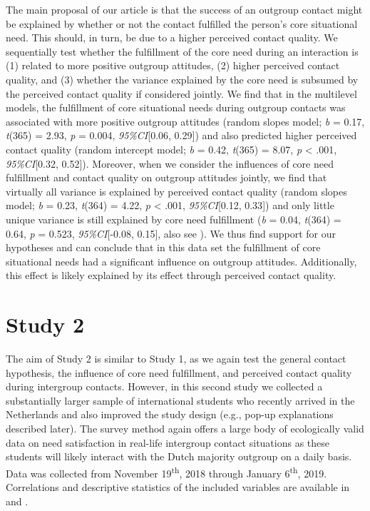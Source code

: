The main proposal of our article is that the success of an outgroup
contact might be explained by whether or not the contact fulfilled the
person's core situational need. This should, in turn, be due to a higher
perceived contact quality. We sequentially test whether the fulfillment
of the core need during an interaction is (1) related to more positive
outgroup attitudes, (2) higher perceived contact quality, and (3)
whether the variance explained by the core need is subsumed by the
perceived contact quality if considered jointly. We find that in the
multilevel models, the fulfillment of core situational needs during
outgroup contacts was associated with more positive outgroup attitudes
(random slopes model; \textit{b} = 0.17, \textit{t}(365) = 2.93,
\textit{p} = 0.004, \textit{95\%CI}{[}0.06, 0.29{]}) and also predicted
higher perceived contact quality (random intercept model; \textit{b} =
0.42, \textit{t}(365) = 8.07, \textit{p} \textless{} .001,
\textit{95\%CI}{[}0.32, 0.52{]}). Moreover, when we consider the
influences of core need fulfillment and contact quality on outgroup
attitudes jointly, we find that virtually all variance is explained by
perceived contact quality (random slopes model; \textit{b} = 0.23,
\textit{t}(364) = 4.22, \textit{p} \textless{} .001,
\textit{95\%CI}{[}0.12, 0.33{]}) and only little unique variance is
still explained by core need fulfillment (\textit{b} = 0.04,
\textit{t}(364) = 0.64, \textit{p} = 0.523, \textit{95\%CI}{[}-0.08,
0.15{]}, also see ). We thus find support for
our hypotheses and can conclude that in this data set the fulfillment of
core situational needs had a significant influence on outgroup
attitudes. Additionally, this effect is likely explained by its effect
through perceived contact quality.

\section{Study 2}

The aim of Study 2 is similar to Study 1, as we again test the general
contact hypothesis, the influence of core need fulfillment, and
perceived contact quality during intergroup contacts. However, in this
second study we collected a substantially larger sample of international
students who recently arrived in the Netherlands and also improved the
study design (e.g., pop-up explanations described later). The survey
method again offers a large body of ecologically valid data on need
satisfaction in real-life intergroup contact situations as these
students will likely interact with the Dutch majority outgroup on a
daily basis. Data was collected from November 19\textsuperscript{th},
2018 through January 6\textsuperscript{th}, 2019. Correlations and
descriptive statistics of the included variables are available in
 and .

